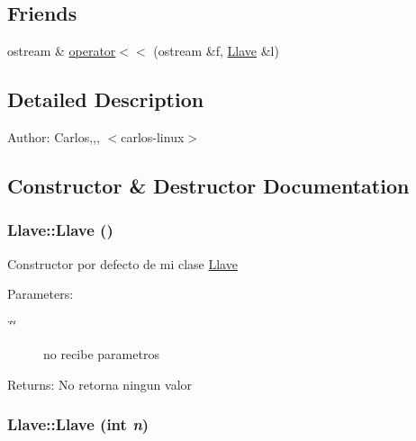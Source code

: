\subsection*{Friends}
\begin{CompactItemize}
\item 
ostream \& \hyperlink{classLlave_749fde97e089059539e396738c36b7d3}{operator$<$$<$} (ostream \&f, \hyperlink{classLlave}{Llave} \&l)
\end{CompactItemize}


\subsection{Detailed Description}
\begin{Desc}
\item[Author:]Carlos,,, $<$carlos-linux$>$ \end{Desc}


\subsection{Constructor \& Destructor Documentation}
\hypertarget{classLlave_a2f4f79518899176f8760ce8d0cc6c26}{
\subsubsection[Llave]{\setlength{\rightskip}{0pt plus 5cm}Llave::Llave ()}}
\label{classLlave_a2f4f79518899176f8760ce8d0cc6c26}


Constructor por defecto de mi clase \hyperlink{classLlave}{Llave} \begin{Desc}
\item[Parameters:]
\begin{description}
\item[{\em \char`\"{}\char`\"{}}]no recibe parametros \end{description}
\end{Desc}
\begin{Desc}
\item[Returns:]No retorna ningun valor \end{Desc}
\hypertarget{classLlave_b3bedc41ed2e5fedbc6d661d625c5cfb}{
\subsubsection[Llave]{\setlength{\rightskip}{0pt plus 5cm}Llave::Llave (int {\em n})}}
\label{classLlave_b3bedc41ed2e5fedbc6d661d625c5cfb}


